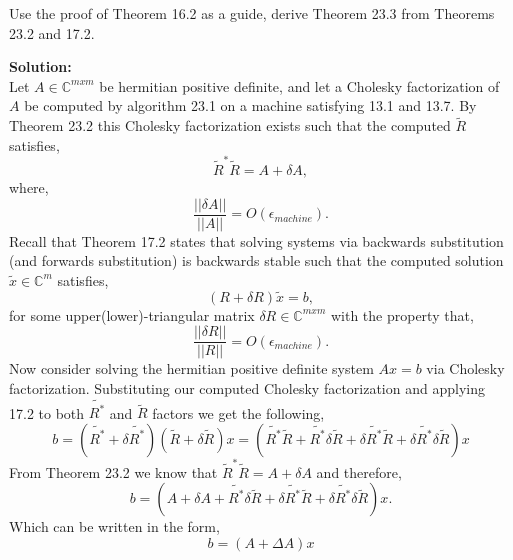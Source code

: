 \documentclass[12pt]{article}
\makeatletter
\theoremstyle{homework}
\newenvironment{exercise}[1]
{\def\@currentlabel{#1}\exercisecore}
{\endexercisecore}
\newcommand{\localhead}[1]{\par\smallskip\noindent\textbf{#1}\nobreak\\}%
\newcommand\solution{\localhead{Solution:}}
\newcommand{\Cplx}{\ensuremath{\mathbb C}}
\let\CC\Cplx
\makeatother
\begin{document}
\vspace{1in}



\begin{exercise}{23.2} Use the proof of Theorem 16.2 as a guide, derive Theorem 23.3 from Theorems 23.2 and 17.2.\\
  \solution Let $A \in \CC^{mxm}$ be hermitian positive definite, and let a Cholesky factorization of $A$ be computed by algorithm 23.1
  on a machine satisfying 13.1 and 13.7. By Theorem 23.2 this Cholesky factorization exists such that the computed $\tilde{R}$ satisfies, 
  \begin{equation*}
    \tilde{R}^*\tilde{R} = A + \delta A, 
  \end{equation*}
  where, 
  \begin{equation*}
    \dfrac{||\delta A||}{||A||} = O(\epsilon_{machine}).
  \end{equation*}
  Recall that Theorem 17.2 states that solving systems via backwards substitution (and forwards substitution) is backwards stable such that the 
  computed solution $\tilde{x} \in \CC^m$ satisfies, 
  \begin{equation*}
    (R + \delta R)\tilde{x} = b,
  \end{equation*}
  for some upper(lower)-triangular matrix $\delta R \in \CC^{mxm}$ with the property that, 
  \begin{equation*}
    \dfrac{||\delta R||}{||R||} = O(\epsilon_{machine}).
  \end{equation*}
  Now consider solving the hermitian positive definite system $Ax = b$ via Cholesky factorization. Substituting our computed 
  Cholesky factorization and applying 17.2 to both $\tilde{R^*}$ and $\tilde{R}$ factors we get the following, 
  \begin{equation*}
    b = (\tilde{R^*} + \delta \tilde{R^*})(\tilde{R} + \delta \tilde{R})x = \left(\tilde{R^*}\tilde{R} + \tilde{R^*}\delta\tilde{R} + \delta\tilde{R^*}\tilde{R} +  \delta \tilde{R^*} \delta \tilde{R}\right)x
  \end{equation*}
  From Theorem 23.2 we know that $\tilde{R}^*\tilde{R} = A+\delta A$ and therefore, 
  \begin{equation*}
    b = \left(A + \delta A + \tilde{R^*}\delta\tilde{R} + \delta\tilde{R^*}\tilde{R} +  \delta \tilde{R^*} \delta \tilde{R}\right)x.
  \end{equation*}
  Which can be written in the form, 
  \begin{equation*}
    b = \left(A + \Delta A\right)x

\end{equation*}
\end{exercise}
\end{document}
